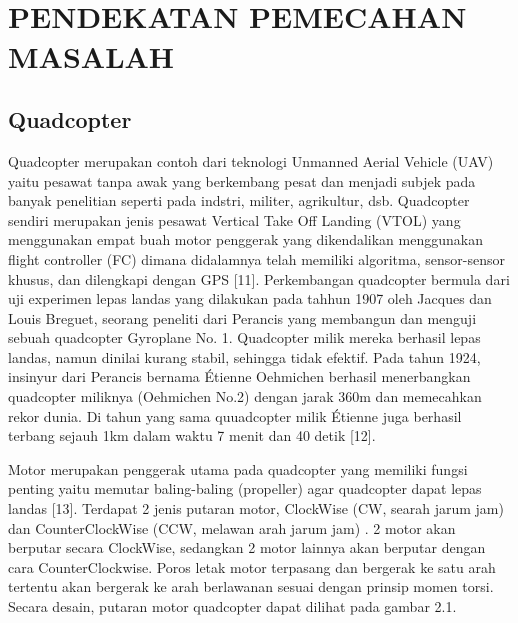 
\chapter[PENDEKATAN PEMECAHAN MASALAH]{\\ PENDEKATAN PEMECAHAN MASALAH}

\section{Quadcopter}
Quadcopter merupakan contoh dari teknologi Unmanned Aerial Vehicle (UAV) yaitu pesawat tanpa awak yang berkembang pesat dan menjadi subjek pada banyak penelitian seperti pada indstri, militer, agrikultur, dsb. Quadcopter sendiri merupakan jenis pesawat Vertical Take Off Landing (VTOL) yang menggunakan empat buah motor penggerak yang dikendalikan menggunakan flight controller (FC) dimana didalamnya telah memiliki algoritma, sensor-sensor khusus, dan dilengkapi dengan GPS [11]. Perkembangan quadcopter bermula dari uji experimen lepas landas yang dilakukan pada tahhun 1907 oleh Jacques dan Louis Breguet, seorang peneliti dari Perancis yang membangun dan menguji sebuah quadcopter Gyroplane No. 1. Quadcopter milik mereka berhasil lepas landas, namun dinilai kurang stabil, sehingga tidak efektif. Pada tahun 1924, insinyur dari Perancis bernama Étienne Oehmichen berhasil menerbangkan quadcopter miliknya (Oehmichen No.2) dengan jarak 360m dan memecahkan rekor dunia. Di tahun yang sama quuadcopter milik Étienne juga berhasil terbang sejauh 1km dalam waktu 7 menit dan 40 detik [12].

Motor merupakan penggerak utama pada quadcopter yang memiliki fungsi penting yaitu memutar baling-baling (propeller) agar quadcopter dapat lepas landas [13]. Terdapat 2 jenis putaran motor,  ClockWise (CW, searah jarum jam) dan CounterClockWise (CCW, melawan arah jarum jam) . 2 motor akan berputar secara ClockWise, sedangkan 2 motor lainnya akan berputar dengan cara CounterClockwise. Poros letak motor terpasang dan bergerak ke satu arah tertentu akan bergerak ke arah berlawanan sesuai dengan prinsip momen torsi. Secara desain, putaran motor quadcopter dapat dilihat pada gambar 2.1.


